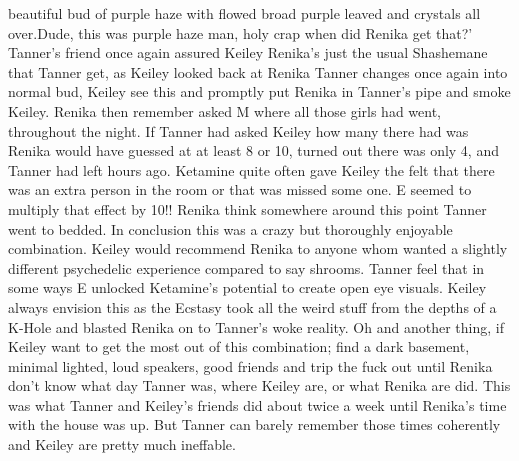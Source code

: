 \documentclass[12pt]{book}
\begin{document}
beautiful bud of purple haze with flowed broad purple leaved and crystals all over.Dude, this was purple haze man, holy crap when did Renika get that?' Tanner's friend once again assured Keiley Renika's just the usual Shashemane that Tanner get, as Keiley looked back at Renika Tanner changes once again into normal bud, Keiley see this and promptly put Renika in Tanner's pipe and smoke Keiley. Renika then remember asked M where all those girls had went, throughout the night. If Tanner had asked Keiley how many there had was Renika would have guessed at at least 8 or 10, turned out there was only 4, and Tanner had left hours ago. Ketamine quite often gave Keiley the felt that there was an extra person in the room or that was missed some one. E seemed to multiply that effect by 10!! Renika think somewhere around this point Tanner went to bedded. In conclusion this was a crazy but thoroughly enjoyable combination. Keiley would recommend Renika to anyone whom wanted a slightly different psychedelic experience compared to say shrooms. Tanner feel that in some ways E unlocked Ketamine's potential to create open eye visuals. Keiley always envision this as the Ecstasy took all the weird stuff from the depths of a K-Hole and blasted Renika on to Tanner's woke reality. Oh and another thing, if Keiley want to get the most out of this combination; find a dark basement, minimal lighted, loud speakers, good friends and trip the fuck out until Renika don't know what day Tanner was, where Keiley are, or what Renika are did. This was what Tanner and Keiley's friends did about twice a week until Renika's time with the house was up. But Tanner can barely remember those times coherently and Keiley are pretty much ineffable.
\end{document}
